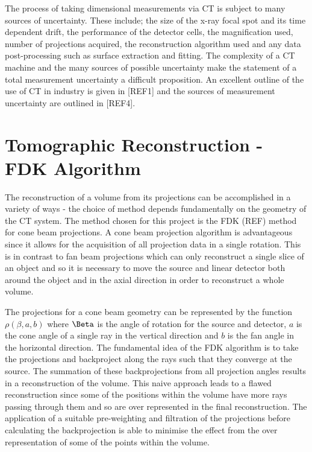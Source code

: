 \documentclass[
  twoside,
  11pt, a4paper,
  footinclude=true,
  headinclude=true,
  cleardoublepage=empty
]{scrbook}
\begin{document}
The process of taking dimensional measurements via CT is subject to many sources of uncertainty. These include; the size of the x-ray focal spot and its time dependent drift, the performance of the detector cells, the magnification used, number of projections acquired, the reconstruction algorithm used and any data post-processing such as surface extraction and fitting. The complexity of a CT machine and the many sources of possible uncertainty make the statement of a total measurement uncertainty a difficult proposition. An excellent outline of the use of CT in industry is given in [REF1] and the sources of measurement uncertainty are outlined in [REF4].

\section{Tomographic Reconstruction - FDK Algorithm}

The reconstruction of a volume from its projections can be accomplished in a variety of ways - the choice of method depends fundamentally on the geometry of the CT system. The method chosen for this project is the FDK (REF) method for cone beam projections. A cone beam projection algorithm is advantageous since it allows for the acquisition of all projection data in a single rotation. This is in contrast to fan beam projections which can only reconstruct a single slice of an object and so it is necessary to move the source and linear detector both around the object and in the axial direction in order to reconstruct a whole volume.

The projections for a cone beam geometry can be represented by the function $\rho(\beta,a,b)$ where $\Beta$ is the angle of rotation for the source and detector, $a$ is the cone angle of a single ray in the vertical direction and $b$ is the fan angle in the horizontal direction. The fundamental idea of the FDK algorithm is to take the projections and backproject along the rays such that they converge at the source. The summation of these backprojections from all projection angles results in a reconstruction of the volume. This naive approach leads to a flawed reconstruction since some of the positions within the volume have more rays passing through them and so are over represented in the final reconstruction. The application of a suitable pre-weighting and filtration of the projections before calculating the backprojection is able to minimise the effect from the over representation of some of the points within the volume.
\end{document}

